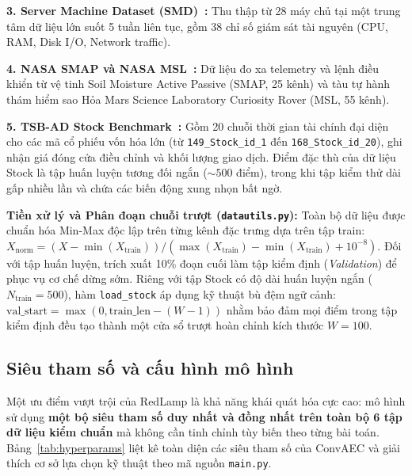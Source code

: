 \documentclass[sigconf,nonacm]{acmart}
\begin{document}
\textbf{3. Server Machine Dataset (SMD)~\cite{su2019}:} Thu thập từ 28 máy chủ tại một trung tâm dữ liệu lớn suốt 5 tuần liên tục, gồm 38 chỉ số giám sát tài nguyên (CPU, RAM, Disk I/O, Network traffic).

\textbf{4. NASA SMAP và NASA MSL~\cite{hundman2018}:} Dữ liệu đo xa telemetry và lệnh điều khiển từ vệ tinh Soil Moisture Active Passive (SMAP, 25 kênh) và tàu tự hành thám hiểm sao Hỏa Mars Science Laboratory Curiosity Rover (MSL, 55 kênh).

\textbf{5. TSB-AD Stock Benchmark~\cite{liu2024}:} Gồm 20 chuỗi thời gian tài chính đại diện cho các mã cổ phiếu vốn hóa lớn (từ \texttt{149\_Stock\_id\_1} đến \texttt{168\_Stock\_id\_20}), ghi nhận giá đóng cửa điều chỉnh và khối lượng giao dịch. Điểm đặc thù của dữ liệu Stock là tập huấn luyện tương đối ngắn ($\sim 500$ điểm), trong khi tập kiểm thử dài gấp nhiều lần và chứa các biến động xung nhọn bất ngờ.

\textbf{Tiền xử lý và Phân đoạn chuỗi trượt (\texttt{datautils.py}):}
Toàn bộ dữ liệu được chuẩn hóa Min-Max độc lập trên từng kênh đặc trưng dựa trên tập train: $X_{\text{norm}} = (X - \min(X_{\text{train}})) / (\max(X_{\text{train}}) - \min(X_{\text{train}}) + 10^{-8})$. Đối với tập huấn luyện, trích xuất 10\% đoạn cuối làm tập kiểm định (\textit{Validation}) để phục vụ cơ chế dừng sớm. Riêng với tập Stock có độ dài huấn luyện ngắn ($N_{\text{train}} = 500$), hàm \texttt{load\_stock} áp dụng kỹ thuật bù đệm ngữ cảnh: $\text{val\_start} = \max(0, \text{train\_len} - (W - 1))$ nhằm bảo đảm mọi điểm trong tập kiểm định đều tạo thành một cửa sổ trượt hoàn chỉnh kích thước $W=100$.

\subsection{Siêu tham số và cấu hình mô hình}

Một ưu điểm vượt trội của RedLamp là khả năng khái quát hóa cực cao: mô hình sử dụng \textbf{một bộ siêu tham số duy nhất và đồng nhất trên toàn bộ 6 tập dữ liệu kiểm chuẩn} mà không cần tinh chỉnh tùy biến theo từng bài toán. Bảng~\ref{tab:hyperparams} liệt kê toàn diện các siêu tham số của ConvAEC và giải thích cơ sở lựa chọn kỹ thuật theo mã nguồn \texttt{main.py}.
\end{document}
